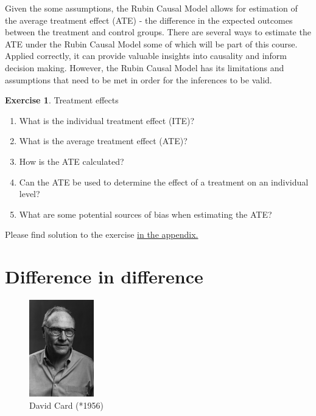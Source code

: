 \documentclass[
  12pt,
  oneside]{book}
\providecommand{\tightlist}{%
  \setlength{\itemsep}{0pt}\setlength{\parskip}{0pt}}
\theoremstyle{definition}
\theoremstyle{definition}
\theoremstyle{definition}
\newtheorem{exercise}{Exercise}[chapter]
\theoremstyle{definition}
\theoremstyle{remark}
\begin{document}
Given the some assumptions, the Rubin Causal Model allows for estimation of the average treatment effect (ATE) - the difference in the expected outcomes between the treatment and control groups. There are several ways to estimate the ATE under the Rubin Causal Model some of which will be part of this course. Applied correctly, it can provide valuable insights into causality and inform decision making. However, the Rubin Causal Model has its limitations and assumptions that need to be met in order for the inferences to be valid.

\begin{exercise}
\protect\hypertarget{exr:treatmenteffects}{}\label{exr:treatmenteffects}Treatment effects

\begin{enumerate}
\def\labelenumi{\arabic{enumi}.}
\tightlist
\item
  What is the individual treatment effect (ITE)?
\item
  What is the average treatment effect (ATE)?
\item
  How is the ATE calculated?
\item
  Can the ATE be used to determine the effect of a treatment on an individual level?
\item
  What are some potential sources of bias when estimating the ATE?
\end{enumerate}

Please find solution to the exercise \protect\hyperlink{sol:treatmenteffects}{in the appendix.}
\end{exercise}

\hypertarget{difference-in-difference}{%
\chapter{Difference in difference}\label{difference-in-difference}}

\begin{figure}
\centering
\includegraphics[width=0.25\textwidth,height=\textheight]{fig/dcard1.jpg}
\caption[\label{fig:dcard} David Card (*1956)]{\label{fig:dcard} David Card (*1956)\footnotemark{}}
\end{figure}
\end{document}
